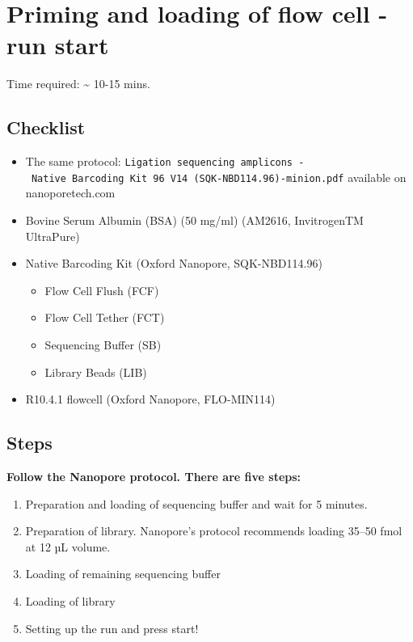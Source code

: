 \documentclass[
]{book}
\providecommand{\tightlist}{%
  \setlength{\itemsep}{0pt}\setlength{\parskip}{0pt}}
\begin{document}
\section{Priming and loading of flow cell - run start}\label{priming-and-loading-of-flow-cell---run-start}

Time required: \textasciitilde{} 10-15 mins.

\subsection{Checklist}\label{checklist-4}

\begin{itemize}
\tightlist
\item
  The same protocol: \texttt{Ligation\ sequencing\ amplicons\ -\ Native\ Barcoding\ Kit\ 96\ V14\ (SQK-NBD114.96)-minion.pdf} available on nanoporetech.com
\item
  Bovine Serum Albumin (BSA) (50 mg/ml) (AM2616, InvitrogenTM UltraPure)
\item
  Native Barcoding Kit (Oxford Nanopore, SQK-NBD114.96)

  \begin{itemize}
  \tightlist
  \item
    Flow Cell Flush (FCF)
  \item
    Flow Cell Tether (FCT)
  \item
    Sequencing Buffer (SB)
  \item
    Library Beads (LIB)
  \end{itemize}
\item
  R10.4.1 flowcell (Oxford Nanopore, FLO-MIN114)
\end{itemize}

\subsection{Steps}\label{steps-3}

\textbf{Follow the Nanopore protocol. There are five steps:}

\begin{enumerate}
\def\labelenumi{\arabic{enumi}.}
\item
  Preparation and loading of sequencing buffer and wait for 5 minutes.
\item
  Preparation of library. Nanopore's protocol recommends loading 35--50 fmol at 12 µL volume.
\item
  Loading of remaining sequencing buffer
\item
  Loading of library
\item
  Setting up the run and press start!
\end{enumerate}

  
\end{document}
